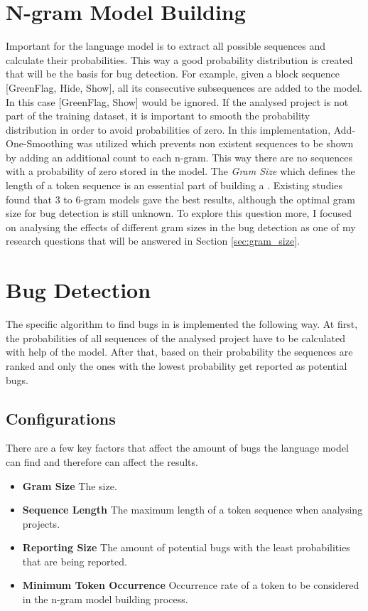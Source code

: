 \section{N-gram Model Building}\label{sec:model}
Important for the language model is to extract all possible sequences and calculate their probabilities. This way a good probability distribution is created that will be the basis for bug detection. For example, given a block sequence [GreenFlag, Hide, Show], all its consecutive subsequences are added to the model. In this case [GreenFlag, Show] would be ignored. If the analysed project is not part of the training dataset, it is important to smooth the probability distribution in order to avoid probabilities of zero. In this implementation, Add-One-Smoothing was utilized which prevents non existent sequences to be shown by adding an additional count to each n-gram. This way there are no sequences with a probability of zero stored in the model. The \emph{Gram Size} which defines the length of a token sequence is an essential part of building a \ngram{}. Existing studies found that 3 to 6-gram models gave the best results, although the optimal gram size for bug detection is still unknown. To explore this question more, I focused on analysing the effects of different gram sizes in the \scratch{} bug detection as one of my research questions that will be answered in Section \ref{sec:gram_size}.

\section{Bug Detection}\label{sec:detection}
The specific algorithm to find bugs in \scratch{} is implemented the following way. At first, the probabilities of all sequences of the analysed project have to be calculated with help of the model. After that, based on their probability the sequences are ranked and only the ones with the lowest probability get reported as potential bugs. 

\subsection{Configurations}\label{subsec:configurations}
There are a few key factors that affect the amount of bugs the language model can find and therefore can affect the results.
\begin{itemize}
\item \textbf{Gram Size} The \ngram{} size.
\item \textbf{Sequence Length} The maximum length of a token sequence when analysing \scratch{} projects. 
\item \textbf{Reporting Size} The amount of potential bugs with the least probabilities that are being reported.
\item \textbf{Minimum Token Occurrence} Occurrence rate of a token to be considered in the n-gram model building process.
\end{itemize} 
